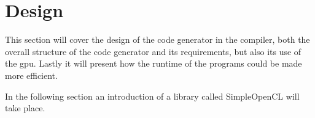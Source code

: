 
\section{Design}
This section will cover the design of the code generator in the compiler, both the overall structure of the code generator and its requirements, but also its use of the \acrshort{gpu}.
Lastly it will present how the runtime of the programs could be made more efficient.






In the following section an introduction of a library called SimpleOpenCL will take place.

